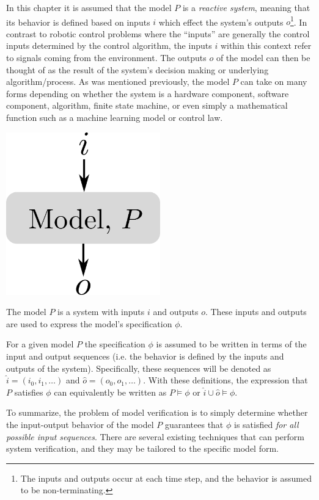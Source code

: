 In this chapter it is assumed that the model $P$ is a \textit{reactive system}, meaning that its behavior is defined based on inputs $i$ which effect the system's outputs $o$\footnote{The inputs and outputs occur at each time step, and the behavior is assumed to be non-terminating.}. In contrast to robotic control problems where the ``inputs'' are generally the control inputs determined by the control algorithm, the inputs $i$ within this context refer to signals coming from the environment. The outputs $o$ of the model can then be thought of as the result of the system's decision making or underlying algorithm/process. As was mentioned previously, the model $P$ can take on many forms depending on whether the system is a hardware component, software component, algorithm, finite state machine, or even simply a mathematical function such as a machine learning model or control law.
\begin{marginfigure} 
\begin{center}
\includegraphics[width=0.5\textwidth]{tex/figs/ch25_figs/model.png}
\caption{The model $P$ is a system with inputs $i$ and outputs $o$. These inputs and outputs are used to express the model's specification $\phi$.}
\label{fig:reachtive_model}
\end{center}
\end{marginfigure}

For a given model $P$ the specification $\phi$ is assumed to be written in terms of the input and output sequences (i.e. the behavior is defined by the inputs and outputs of the system). Specifically, these sequences will be denoted as $\hat{i} = (i_0, i_1, \dots)$ and $\hat{o} = (o_0, o_1, \dots)$. With these definitions, the expression that $P$ satisfies $\phi$ can equivalently be written as $P \models \phi$ or $\hat{i} \cup \hat{o} \models \phi$. 

To summarize, the problem of model verification is to simply determine whether the input-output behavior of the model $P$ guarantees that $\phi$ is satisfied \textit{for all possible input sequences}.
There are several existing techniques that can perform system verification, and they may be tailored to the specific model form\cite{KwiatkowskaNormanEtAl2011}\cite{KatzHuangEtAl2019}.


